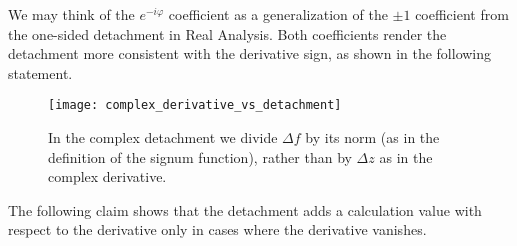 \documentclass[11pt]{book}
\begin{document}
We may think of the $e^{-i\varphi}$ coefficient as a generalization of the $\pm 1$ coefficient from the one-sided detachment in Real Analysis. Both coefficients render the detachment more consistent with the derivative sign, as shown in the following statement.

\begin{figure}[H]
\texttt{[image: complex\_derivative\_vs\_detachment]}
\caption{In the complex detachment we divide $\Delta f$ by its norm (as in the definition of the signum function), rather than by $\Delta z$ as in the complex derivative.}
\end{figure}

The following claim shows that the detachment adds a calculation value with respect to the derivative only in cases where the derivative vanishes.
\end{document}
